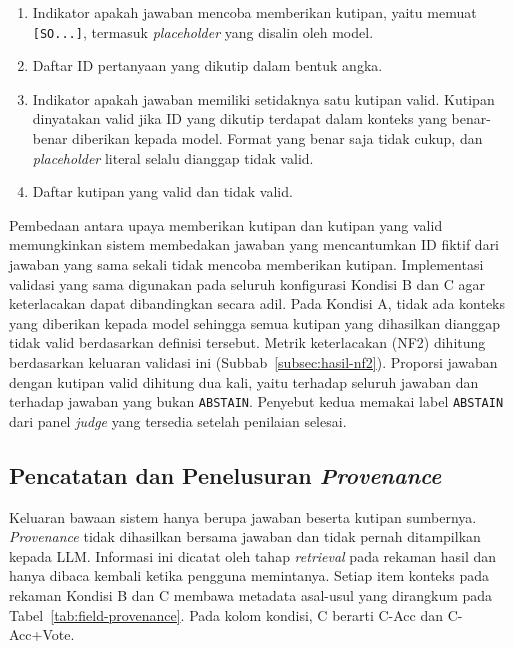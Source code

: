 \begin{enumerate}
\item Indikator apakah jawaban mencoba memberikan kutipan, yaitu memuat \texttt{[SO...]}, termasuk \emph{placeholder} yang disalin oleh model.
\item Daftar ID pertanyaan yang dikutip dalam bentuk angka.
\item Indikator apakah jawaban memiliki setidaknya satu kutipan valid. Kutipan dinyatakan valid jika ID yang dikutip terdapat dalam konteks yang benar-benar diberikan kepada model. Format yang benar saja tidak cukup, dan \emph{placeholder} literal selalu dianggap tidak valid.
\item Daftar kutipan yang valid dan tidak valid.
\end{enumerate}

Pembedaan antara upaya memberikan kutipan dan kutipan yang valid memungkinkan sistem membedakan jawaban yang mencantumkan ID fiktif dari jawaban yang sama sekali tidak mencoba memberikan kutipan. Implementasi validasi yang sama digunakan pada seluruh konfigurasi Kondisi B dan C agar keterlacakan dapat dibandingkan secara adil. Pada Kondisi A, tidak ada konteks yang diberikan kepada model sehingga semua kutipan yang dihasilkan dianggap tidak valid berdasarkan definisi tersebut. Metrik keterlacakan (NF2) dihitung berdasarkan keluaran validasi ini (Subbab~\ref{subsec:hasil-nf2}). Proporsi jawaban dengan kutipan valid dihitung dua kali, yaitu terhadap seluruh jawaban dan terhadap jawaban yang bukan \texttt{ABSTAIN}. Penyebut kedua memakai label \texttt{ABSTAIN} dari panel \emph{judge} yang tersedia setelah penilaian selesai.

\subsection{Pencatatan dan Penelusuran \emph{Provenance}}
\label{subsec:implementasi-provenance}

Keluaran bawaan sistem hanya berupa jawaban beserta kutipan sumbernya. \emph{Provenance} tidak dihasilkan bersama jawaban dan tidak pernah ditampilkan kepada LLM. Informasi ini dicatat oleh tahap \emph{retrieval} pada rekaman hasil dan hanya dibaca kembali ketika pengguna memintanya. Setiap item konteks pada rekaman Kondisi B dan C membawa metadata asal-usul yang dirangkum pada Tabel~\ref{tab:field-provenance}. Pada kolom kondisi, C berarti C-Acc dan C-Acc+Vote.

